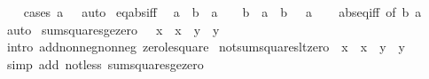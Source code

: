\begin{isabellebody}
%
\isadelimproof
\ \ %
\endisadelimproof
%
\isatagproof
{}\isamarkupfalse%
\ {\isacharparenleft}{\kern0pt}cases\ {\isachardoublequoteopen}a\ {\isasymge}\ {}{\isachardoublequoteclose}{\isacharparenright}{\kern0pt}\ auto%
\endisatagproof
{\isafoldproof}%
%
\isadelimproof
\isanewline
%
\endisadelimproof
\isanewline
{}\isamarkupfalse%
\ eq{\isacharunderscore}{\kern0pt}abs{\isacharunderscore}{\kern0pt}iff{\isacharprime}{\kern0pt}{\isacharcolon}{\kern0pt}\isanewline
\ \ {\isachardoublequoteopen}a\ {\isacharequal}{\kern0pt}\ {\isasymbar}b{\isasymbar}\ {\isasymlongleftrightarrow}\ a\ {\isasymge}\ {}\ {\isasymand}\ {\isacharparenleft}{\kern0pt}b\ {\isacharequal}{\kern0pt}\ a\ {\isasymor}\ b\ {\isacharequal}{\kern0pt}\ {\isacharminus}{\kern0pt}\ a{\isacharparenright}{\kern0pt}{\isachardoublequoteclose}\isanewline
%
\isadelimproof
\ \ %
\endisadelimproof
%
\isatagproof
{}\isamarkupfalse%
\ abs{\isacharunderscore}{\kern0pt}eq{\isacharunderscore}{\kern0pt}iff{\isacharprime}{\kern0pt}\ {\isacharbrackleft}{\kern0pt}of\ b\ a{\isacharbrackright}{\kern0pt}\ \isamarkupfalse%
\ auto%
\endisatagproof
{\isafoldproof}%
%
\isadelimproof
\isanewline
%
\endisadelimproof
\isanewline
{}\isamarkupfalse%
\ sum{\isacharunderscore}{\kern0pt}squares{\isacharunderscore}{\kern0pt}ge{\isacharunderscore}{\kern0pt}zero{\isacharcolon}{\kern0pt}\ {\isachardoublequoteopen}{}\ {\isasymle}\ x\ {\isacharasterisk}{\kern0pt}\ x\ {\isacharplus}{\kern0pt}\ y\ {\isacharasterisk}{\kern0pt}\ y{\isachardoublequoteclose}\isanewline
%
\isadelimproof
\ \ %
\endisadelimproof
%
\isatagproof
{}\isamarkupfalse%
\ {\isacharparenleft}{\kern0pt}intro\ add{\isacharunderscore}{\kern0pt}nonneg{\isacharunderscore}{\kern0pt}nonneg\ zero{\isacharunderscore}{\kern0pt}le{\isacharunderscore}{\kern0pt}square{\isacharparenright}{\kern0pt}%
\endisatagproof
{\isafoldproof}%
%
\isadelimproof
\isanewline
%
\endisadelimproof
\isanewline
{}\isamarkupfalse%
\ not{\isacharunderscore}{\kern0pt}sum{\isacharunderscore}{\kern0pt}squares{\isacharunderscore}{\kern0pt}lt{\isacharunderscore}{\kern0pt}zero{\isacharcolon}{\kern0pt}\ {\isachardoublequoteopen}{\isasymnot}\ x\ {\isacharasterisk}{\kern0pt}\ x\ {\isacharplus}{\kern0pt}\ y\ {\isacharasterisk}{\kern0pt}\ y\ {\isacharless}{\kern0pt}\ {}{\isachardoublequoteclose}\isanewline
%
\isadelimproof
\ \ %
\endisadelimproof
%
\isatagproof
{}\isamarkupfalse%
\ {\isacharparenleft}{\kern0pt}simp\ add{\isacharcolon}{\kern0pt}\ not{\isacharunderscore}{\kern0pt}less\ sum{\isacharunderscore}{\kern0pt}squares{\isacharunderscore}{\kern0pt}ge{\isacharunderscore}{\kern0pt}zero{\isacharparenright}{\kern0pt}%

\end{isabellebody}
